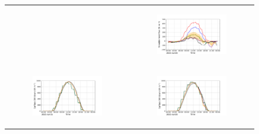 \begin{figure}[hbtp]
\begin{tabular}{cc}
\begin{subfigure}[t]{0.5\textwidth}
        \end{subfigure} &
        \begin{subfigure}[t]{0.5\textwidth}
            \caption{}
            \includegraphics[width=\textwidth]{images/chap5/IOP_TS/TS_2021-07-20_cendrosa_sens.png}
        \end{subfigure} \\
        \begin{subfigure}[t]{0.5\textwidth}
            \caption{}
            \includegraphics[width=\textwidth]{images/chap5/IOP_TS/TS_2021-07-15_cendrosa_SWdnSFC.png}
        \end{subfigure} &
        \begin{subfigure}[t]{0.5\textwidth}
            \caption{}
            \includegraphics[width=\textwidth]{images/chap5/IOP_TS/TS_2021-07-20_cendrosa_SWdnSFC.png}

\end{subfigure}
\end{tabular}
\end{figure}
